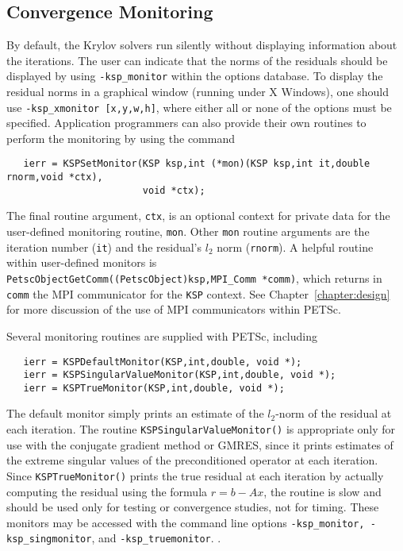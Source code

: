 \subsection{Convergence Monitoring}
\label{sec:kspmonitor}

By default, the Krylov solvers run silently without displaying information 
about the iterations. The user can indicate that the norms of the residuals 
should be displayed by using 
{\tt -ksp\_monitor} within the options database.  
To display the residual norms in a graphical window (running under X Windows),
one should use {\tt -ksp\_xmonitor [x,y,w,h]}, where either all or none of 
the options must be specified. 
Application programmers can also provide their own routines to perform 
the monitoring by using the command 
\begin{verbatim}
   ierr = KSPSetMonitor(KSP ksp,int (*mon)(KSP ksp,int it,double rnorm,void *ctx),
                        void *ctx);
\end{verbatim}
The final routine argument, {\tt ctx}, is an optional context for private
data for the user-defined monitoring routine, {\tt mon}.  Other
{\tt mon} routine arguments are the iteration
number ({\tt it}) and the residual's $ l_2 $ norm ({\tt rnorm}).
A helpful routine within user-defined monitors is 
{\tt PetscObjectGetComm((PetscObject)ksp,MPI\_Comm *comm)}, which returns
in {\tt comm}   the
MPI communicator for the {\tt KSP} context.  See Chapter~\ref{chapter:design}
for more discussion of the use of MPI communicators within PETSc.

Several monitoring routines are supplied with PETSc, 
including  
\begin{verbatim}
   ierr = KSPDefaultMonitor(KSP,int,double, void *);
   ierr = KSPSingularValueMonitor(KSP,int,double, void *);
   ierr = KSPTrueMonitor(KSP,int,double, void *);
\end{verbatim}
The default monitor simply prints an estimate of the $l_2$-norm of the 
residual at each iteration. The routine
{\tt KSPSingularValueMonitor()} is appropriate only for use with the conjugate 
gradient method or GMRES, since it prints estimates of the extreme singular 
values of the preconditioned operator at each iteration. Since
{\tt KSPTrueMonitor()} prints 
the true residual at each iteration by 
actually computing the residual using the formula $ r = b - Ax $, the routine
is slow and should be used only for testing or convergence studies,
not for timing. These monitors may be accessed with the command line options
{\tt -ksp\_monitor, -ksp\_singmonitor}, and {\tt -ksp\_truemonitor}.
  .

